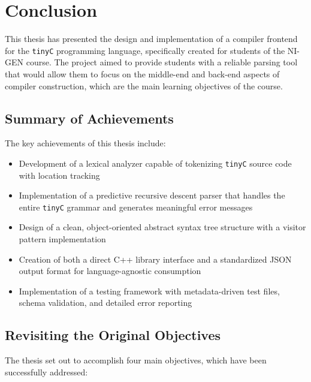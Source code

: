 \chapter{Conclusion}

This thesis has presented the design and implementation of a compiler frontend for the \texttt{tinyC} programming language, specifically created for students of the NI-GEN course. The project aimed to provide students with a reliable parsing tool that would allow them to focus on the middle-end and back-end aspects of compiler construction, which are the main learning objectives of the course.

\section{Summary of Achievements}

The key achievements of this thesis include:

\begin{itemize}
    \item Development of a lexical analyzer capable of tokenizing \texttt{tinyC} source code with location tracking
    \item Implementation of a predictive recursive descent parser that handles the entire \texttt{tinyC} grammar and generates meaningful error messages
    \item Design of a clean, object-oriented abstract syntax tree structure with a visitor pattern implementation
    \item Creation of both a direct C++ library interface and a standardized JSON output format for language-agnostic consumption
    \item Implementation of a testing framework with metadata-driven test files, schema validation, and detailed error reporting
\end{itemize}

\section{Revisiting the Original Objectives}

The thesis set out to accomplish four main objectives, which have been successfully addressed:

